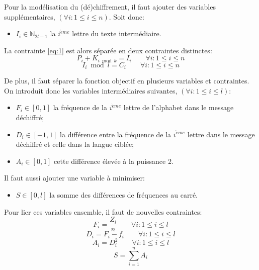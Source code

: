 \documentclass[11pt]{article}
\begin{document}
				Pour la modélisation du (dé)chiffrement, il faut ajouter des variables supplémentaires, $(\forall i : 1 \leq i \leq n)$. Soit donc:
				\begin{itemize}
					\item $I_i \in \mathbb{N}_{2l-1}$ la $i^{\grave{e}me}$ lettre du texte intermédiaire.
				\end{itemize}

				\bigskip

				La contrainte \ref{eq:1} est alors séparée en deux contraintes distinctes:
				\begin{equation} \label{eq:5}
					P_i + K_{i \bmod k} = I_i \qquad \forall i : 1 \leq i \leq n
				\end{equation}
				\begin{equation} \label{eq:6}
					I_i \bmod l = C_i \qquad \forall i : 1 \leq i \leq n
				\end{equation}

				De plus, il faut séparer la fonction objectif en plusieurs variables et contraintes. On introduit donc les variables intermédiaires suivantes, $(\forall i : 1 \leq i \leq l)$:
				\begin{itemize}
					\item $F_i \in [0,1]$ la fréquence de la $i^{\grave{e}me}$ lettre de l'alphabet dans le message déchiffré;
					\item $D_i \in [-1,1]$ la différence entre la fréquence de la $i^{\grave{e}me}$ lettre dans le message déchiffré et celle dans la langue ciblée;
					\item $A_i \in [0,1]$ cette différence élevée à la puissance 2.
				\end{itemize}

				\bigskip

				Il faut aussi ajouter une variable à minimiser:
				\begin{itemize}
					\item $S \in [0,l]$ la somme des différences de fréquences au carré.
				\end{itemize}

				\bigskip

				Pour lier ces variables ensemble, il faut de nouvelles contraintes:
				\begin{equation} \label{eq:7}
					F_i = \frac{Z_i}{n} \qquad \forall i : 1 \leq i \leq l
				\end{equation}
				\begin{equation} \label{eq:8}
					D_i = F_i - f_i \qquad \forall i : 1 \leq i \leq l
				\end{equation}
				\begin{equation} \label{eq:9}
					A_i = D_i^2 \qquad \forall i : 1 \leq i \leq l
				\end{equation}
				\begin{equation} \label{eq:10}
					S = \sum\limits_{i = 1}^n A_i
				\end{equation}
\end{document}

